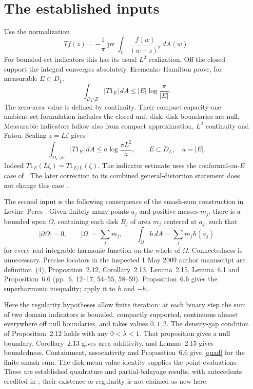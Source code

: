 \documentclass[11pt]{article}
\newcommand{\C}{\mathbb C}
\newcommand{\dd}{\,dA}
\begin{document}
\section{The established inputs}
Use the normalization
\[
 Tf(z)=-\frac1\pi\operatorname{pv}
       \int_{\C}\frac{f(w)}{(w-z)^2}\,dA(w).
\]
For bounded-set indicators this has its usual \(L^2\) realization.
Off the closed support the integral converges absolutely.
Eremenko--Hamilton \cite[printed p.~2794, proof pp.~2796--2797]{EH}
prove, for measurable \(E\subset D_1\),
\begin{equation}\label{EH}
 \int_{D_1\setminus E}|T1_E|\dd
 \le |E|\log\frac{\pi}{|E|}.
\end{equation}
The zero-area value is defined by continuity. Their compact
capacity-one ambient-set formulation includes the closed unit disk;
disk boundaries are null. Measurable indicators follow also from
compact approximation, \(L^2\) continuity and Fatou.
Scaling \(z=L\zeta\) gives
\begin{equation}\label{scale}
 \int_{D_L\setminus E}|T1_E|\dd
 \le a\log\frac{\pi L^2}{a},\qquad
 E\subset D_L,\quad a=|E|.
\end{equation}
Indeed \(T1_E(L\zeta)=T1_{E/L}(\zeta)\).
The indicator estimate uses the conformal-on-\(E\) case of
\cite[Theorem~1(i)]{EH}. The later correction to its combined
general-distortion statement does not change this case
\cite[Theorem~5 and correction discussion]{EH2002}.

The second input is the following consequence of the smash-sum
construction in Levine--Peres \cite{LP}. Given finitely many
points \(a_j\) and positive masses \(m_j\), there is a bounded open
\(\Omega\), containing each disk \(B_j\) of area \(m_j\) centered at
\(a_j\), such that
\begin{equation}\label{quad}
 |\partial\Omega|=0,\qquad |\Omega|=\sum_jm_j,\qquad
 \int_\Omega h\dd=\sum_jm_jh(a_j)
\end{equation}
for every real integrable harmonic function on the whole of \(\Omega\).
Connectedness is unnecessary. Precise locators in the inspected
1 May 2009 author manuscript are definition~(4), Proposition~2.12,
Corollary~2.13, Lemma~2.15, Lemma~6.1 and Proposition~6.6
(pp.~6, 12--17, 54--55, 58--59).
Proposition~6.6 gives the superharmonic inequality; apply it to
\(h\) and \(-h\).

Here the regularity hypotheses allow finite iteration:
at each binary step the sum of two domain indicators is bounded,
compactly supported, continuous almost everywhere off null boundaries,
and takes values \(0,1,2\). The density-gap condition of
Proposition~2.12 holds with any \(0<\lambda<1\). That proposition
gives a null boundary, Corollary~2.13 gives area additivity, and
Lemma~2.15 gives boundedness. Containment, associativity and
Proposition~6.6 give \eqref{quad} for the finite smash sum.
The disk mean-value identity supplies the point evaluations.
These are established quadrature and partial-balayage results,
with antecedents credited in \cite{LP}; their existence or regularity
is not claimed as new here.
\end{document}
